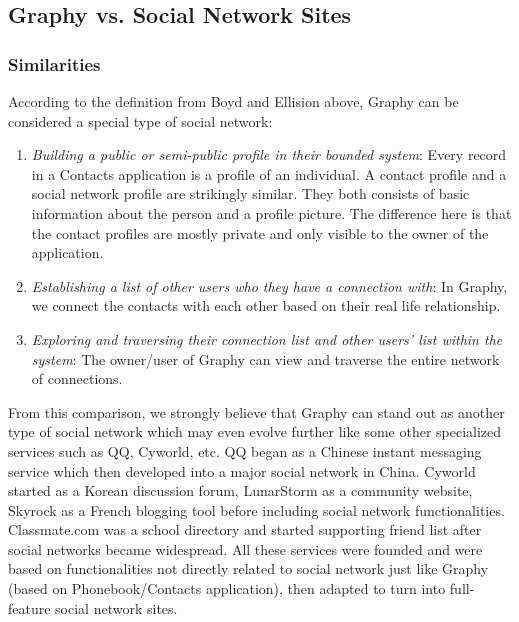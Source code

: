 
\subsection{Graphy vs. Social Network Sites}
\subsubsection{Similarities}
According to the definition from Boyd and Ellision above, Graphy can be considered a special type of social network:

\begin{enumerate}
    \item \textit{Building a public or semi-public profile in their bounded system}: Every record in a Contacts application is a profile of an individual. A contact profile and a social network profile are strikingly similar. They both consists of basic information about the person and a profile picture. The difference here is that the contact profiles are mostly private and only visible to the owner of the application.
    \item \textit{Establishing a list of other users who they have a connection with}: In Graphy, we connect the contacts with each other based on their real life relationship.
    \item \textit{Exploring and traversing their connection list and other users' list within the system}: The owner/user of Graphy can view and traverse the entire network of connections.
\end{enumerate}

From this comparison, we strongly believe that Graphy can stand out as another type of social network which may even evolve further like some other specialized services such as QQ, Cyworld, etc. QQ began as a Chinese instant messaging service which then developed into a major social network in China. Cyworld started as a Korean discussion forum, LunarStorm as a community website, Skyrock as a French blogging tool before including social network functionalities. Classmate.com was a school directory and started supporting friend list after social networks became widespread. All these services were founded and were based on functionalities not directly related to social network just like Graphy (based on Phonebook/Contacts application), then adapted to turn into full-feature social network sites.

